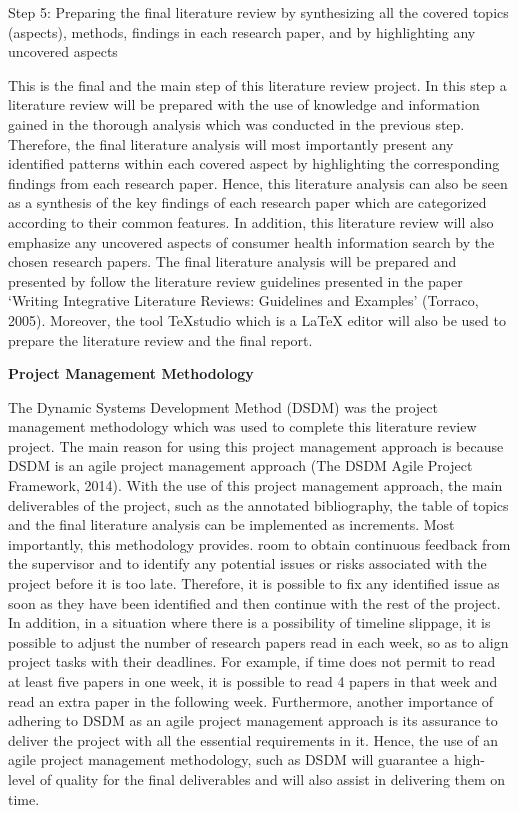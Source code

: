 \documentclass[]{article}
\begin{document}
Step 5: Preparing the final literature review by synthesizing all the covered topics (aspects), methods, findings in each research paper, and by highlighting any uncovered aspects
	
This is the final and the main step of this literature review project. In this step a literature review will be prepared with the use of knowledge and information gained in the thorough analysis which was conducted in the previous step. Therefore, the final literature analysis will most importantly present any identified patterns within each covered aspect by highlighting the corresponding findings from each research paper. Hence, this literature analysis can also be seen as a synthesis of the key findings of each research paper which are categorized according to their common features. In addition, this literature review will also emphasize any uncovered aspects of consumer health information search by the chosen research papers. The final literature analysis will be prepared and presented by follow the literature review guidelines presented in the paper ‘Writing Integrative Literature Reviews: Guidelines and Examples’ (Torraco, 2005). Moreover, the tool TeXstudio which is a LaTeX editor will also be used to prepare the literature review and the final report.
	
\textbf{Project Management Methodology}  
	
The Dynamic Systems Development Method (DSDM) was the project management methodology which was used to complete this literature review project. The main reason for using this project management approach is because DSDM is an agile project management approach (The DSDM Agile Project Framework, 2014). With the use of this project management approach, the main deliverables of the project, such as the annotated bibliography, the table of topics and the final literature analysis can be implemented as increments. Most importantly, this methodology provides. room to obtain continuous feedback from the supervisor and to identify any potential issues or risks associated with the project before it is too late. Therefore, it is possible to fix any identified issue as soon as they have been identified and then continue with the rest of the project. In addition, in a situation where there is a possibility of timeline slippage, it is possible to adjust the number of research papers read in each week, so as to align project tasks with their deadlines. For example, if time does not permit to read at least five papers in one week, it is possible to read 4 papers in that week and read an extra paper in the following week. Furthermore, another importance of adhering to DSDM as an agile project management approach is its assurance to deliver the project with all the essential requirements in it. Hence, the use of an agile project management methodology, such as DSDM will guarantee a high-level of quality for the final deliverables and will also assist in delivering them on time. 
	
\end{document}
